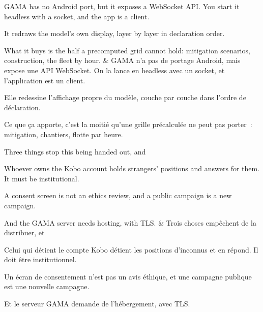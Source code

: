 \documentclass[10pt,a4paper]{article}
\begin{document}
\begin{say}
GAMA has no Android port, but it exposes a WebSocket API. You start it headless
with a socket, and the app is a client. 

It redraws the model's own display, layer by layer in declaration order.

What it buys is the half a precomputed grid cannot hold: mitigation scenarios,
construction, the fleet by hour.
&
GAMA n'a pas de portage Android, mais expose une API WebSocket. On la lance en
headless avec un socket, et l'application est un client. 

Elle redessine l'affichage propre du modèle, couche par couche dans l'ordre de
déclaration.

Ce que ça apporte, c'est la moitié qu'une grille précalculée ne peut pas porter~:
mitigation, chantiers, flotte par heure.
\end{say}

\begin{say}
Three things stop this being handed out, and 

Whoever owns the Kobo account holds strangers' positions and answers for them. It
must be institutional. 

A consent screen is not an ethics review, and a public campaign is a new campaign.

And the GAMA server needs hosting, with TLS.
&
Trois choses empêchent de la distribuer, et 

Celui qui détient le compte Kobo détient les positions d'inconnus et en répond. Il
doit être institutionnel. 

Un écran de consentement n'est pas un avis éthique, et une campagne publique est
une nouvelle campagne.

Et le serveur GAMA demande de l'hébergement, avec TLS.
\end{say}

\clearpage
\end{document}

